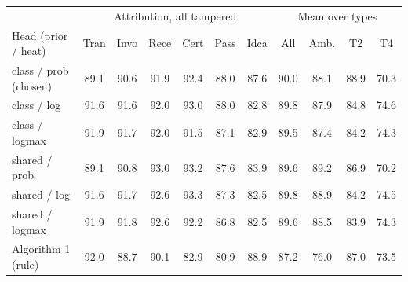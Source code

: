 \begin{tabular}{lcccccccccc}
\toprule
 & \multicolumn{6}{c}{Attribution, all tampered} & \multicolumn{4}{c}{Mean over types}\\
Head (prior / heat) & Tran & Invo & Rece & Cert & Pass & Idca & All & Amb. & T2 & T4\\
\midrule
class / prob (chosen) & 89.1 & 90.6 & 91.9 & 92.4 & 88.0 & 87.6 & 90.0 & 88.1 & 88.9 & 70.3\\
class / log & 91.6 & 91.6 & 92.0 & 93.0 & 88.0 & 82.8 & 89.8 & 87.9 & 84.8 & 74.6\\
class / logmax & 91.9 & 91.7 & 92.0 & 91.5 & 87.1 & 82.9 & 89.5 & 87.4 & 84.2 & 74.3\\
shared / prob & 89.1 & 90.8 & 93.0 & 93.2 & 87.6 & 83.9 & 89.6 & 89.2 & 86.9 & 70.2\\
shared / log & 91.6 & 91.7 & 92.6 & 93.3 & 87.3 & 82.5 & 89.8 & 88.9 & 84.2 & 74.5\\
shared / logmax & 91.9 & 91.8 & 92.6 & 92.2 & 86.8 & 82.5 & 89.6 & 88.5 & 83.9 & 74.3\\
Algorithm 1 (rule) & 92.0 & 88.7 & 90.1 & 82.9 & 80.9 & 88.9 & 87.2 & 76.0 & 87.0 & 73.5\\
\bottomrule
\end{tabular}
